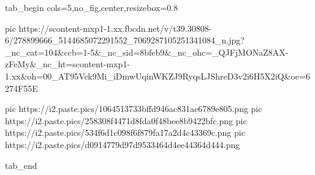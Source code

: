  
 
 
 
 

\ifcmt
  tab_begin cols=5,no_fig,center,resizebox=0.8

     pic https://scontent-mxp1-1.xx.fbcdn.net/v/t39.30808-6/278899666_5144685072291552_7069287105251341084_n.jpg?_nc_cat=104&ccb=1-5&_nc_sid=8bfeb9&_nc_ohc=_QJFjMONaZ8AX-zFeMy&_nc_ht=scontent-mxp1-1.xx&oh=00_AT95Vck9Mi_iDmwUqinWKZJ9RyqsLJShreD3v2i6H5X2iQ&oe=6274F55E
		 
		 pic https://i2.paste.pics/1064513733bffd946ac831ae6789e805.png
		 pic https://i2.paste.pics/258308f4471d8fda0f48bee8b9422bfc.png
		 pic https://i2.paste.pics/534f6d1c098f6f879fa17a2d4c43369c.png
		 pic https://i2.paste.pics/d0914779d97d9533464d4ee44364d444.png

  tab_end
\fi
